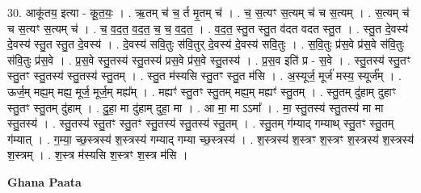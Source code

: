 \documentclass[17pt]{extarticle}
\begin{document}
30. आकू॑तय॒ इत्या - कू॒त॒यः॒ । . ऋ॒तम् च॑ च॒ र्त मृ॒तम् च॑ । . च॒ स॒त्यꣳ स॒त्यम् च॑ च स॒त्यम् । . स॒त्यम् च॑ च स॒त्यꣳ स॒त्यम् च॑ । . च॒ व॒द॒त॒ व॒द॒त॒ च॒ च॒ व॒द॒त॒ । . व॒द॒त॒ स्तु॒त स्तु॒त व॑दत वदत स्तु॒त । . स्तु॒त दे॒वस्य॑ दे॒वस्य॑ स्तु॒त स्तु॒त दे॒वस्य॑ । . दे॒वस्य॑ सवि॒तुः स॑वि॒तुर् दे॒वस्य॑ दे॒वस्य॑ सवि॒तुः । . स॒वि॒तुः प्र॑स॒वे प्र॑स॒वे स॑वि॒तुः स॑वि॒तुः प्र॑स॒वे । . प्र॒स॒वे स्तु॒तस्य॑ स्तु॒तस्य॑ प्रस॒वे प्र॑स॒वे स्तु॒तस्य॑ । . प्र॒स॒व इति॑ प्र - स॒वे । . स्तु॒तस्य॑ स्तु॒तꣳ स्तु॒तꣳ स्तु॒तस्य॑ स्तु॒तस्य॑ स्तु॒तम् । . स्तु॒त म॑स्यसि स्तु॒तꣳ स्तु॒त म॑सि । . अ॒स्यूर्ज॒ मूर्ज॑ मस्य॒ स्यूर्ज᳚म् । . ऊर्ज॒म् मह्य॒म् मह्य॒ मूर्ज॒ मूर्ज॒म् मह्य᳚म् । . मह्यꣳ॑ स्तु॒तꣳ स्तु॒तम् मह्य॒म् मह्यꣳ॑ स्तु॒तम् । . स्तु॒तम् दु॑हाम् दुहाꣳ स्तु॒तꣳ स्तु॒तम् दु॑हाम् । . दु॒हा॒ मा दु॑हाम् दुहा॒ मा । . आ मा॒ मा ऽऽमा᳚ । . मा॒ स्तु॒तस्य॑ स्तु॒तस्य॑ मा मा स्तु॒तस्य॑ । . स्तु॒तस्य॑ स्तु॒तꣳ स्तु॒तꣳ स्तु॒तस्य॑ स्तु॒तस्य॑ स्तु॒तम् । . स्तु॒तम् ग॑म्याद् गम्याथ् स्तु॒तꣳ स्तु॒तम् ग॑म्यात् । . ग॒म्या॒ च्छ॒स्त्रस्य॑ श॒स्त्रस्य॑ गम्याद् गम्या च्छ॒स्त्रस्य॑ । . श॒स्त्रस्य॑ श॒स्त्रꣳ श॒स्त्रꣳ श॒स्त्रस्य॑ श॒स्त्रस्य॑ श॒स्त्रम् । . श॒स्त्र म॑स्यसि श॒स्त्रꣳ श॒स्त्र म॑सि । \newline

\textbf{Ghana Paata } \newline
\end{document}
